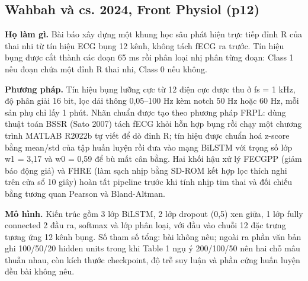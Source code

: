 \documentclass[12pt,a4paper]{article}
\begin{document}
\subsection{Wahbah và cs. 2024, Front Physiol \normalfont\small (p12)}
\par\vspace{2pt}
\par\vspace{4pt}
\noindent \textbf{Họ làm gì.} Bài báo xây dựng một khung học sâu phát hiện trực tiếp đỉnh R của thai nhi từ tín hiệu ECG bụng 12 kênh, không tách fECG ra trước. Tín hiệu bụng được cắt thành các đoạn 65 ms rồi phân loại nhị phân từng đoạn: Class 1 nếu đoạn chứa một đỉnh R thai nhi, Class 0 nếu không.\par\vspace{3pt}
\noindent \textbf{Phương pháp.} Tín hiệu bụng lưỡng cực từ 12 điện cực được thu ở fs = 1 kHz, độ phân giải 16 bit, lọc dải thông 0,05–100 Hz kèm notch 50 Hz hoặc 60 Hz, mỗi sản phụ chỉ lấy 1 phút. Nhãn chuẩn được tạo theo phương pháp FRPL: dùng thuật toán BSSR (Sato 2007) tách fECG khỏi hỗn hợp bụng rồi chạy một chương trình MATLAB R2022b tự viết để dò đỉnh R; tín hiệu được chuẩn hoá z-score bằng mean/std của tập huấn luyện rồi đưa vào mạng BiLSTM với trọng số lớp w1 = 3,17 và w0 = 0,59 để bù mất cân bằng. Hai khối hậu xử lý FECGPP (giảm báo động giả) và FHRE (làm sạch nhịp bằng SD-ROM kết hợp lọc thích nghi trên cửa sổ 10 giây) hoàn tất pipeline trước khi tính nhịp tim thai và đối chiếu bằng tương quan Pearson và Bland-Altman.\par\vspace{3pt}
\noindent \textbf{Mô hình.} Kiến trúc gồm 3 lớp BiLSTM, 2 lớp dropout (0,5) xen giữa, 1 lớp fully connected 2 đầu ra, softmax và lớp phân loại, với đầu vào chuỗi 12 đặc trưng tương ứng 12 kênh bụng. Số tham số tổng: bài không nêu; ngoài ra phần văn bản ghi 100/50/20 hidden units trong khi Table 1 ngụ ý 200/100/50 nên hai chỗ mâu thuẫn nhau, còn kích thước checkpoint, độ trễ suy luận và phần cứng huấn luyện đều bài không nêu.\par\vspace{3pt}
\end{document}
